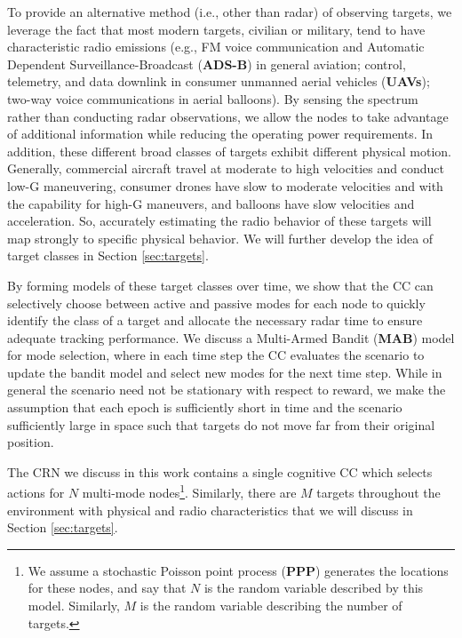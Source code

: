\documentclass[journal,12pt,onecolumn,draftclsnofoot,]{IEEEtran}
\theoremstyle{definition}
\begin{document}
To provide an alternative method (i.e., other than radar) of observing targets, we leverage the fact that most modern targets, civilian or military, tend to have characteristic radio emissions (e.g., FM voice communication and Automatic Dependent Surveillance-Broadcast (\textbf{ADS-B}) in general aviation; control, telemetry, and data downlink in consumer unmanned aerial vehicles (\textbf{UAVs}); two-way voice communications in aerial balloons). 
By sensing the spectrum rather than conducting radar observations, we allow the nodes to take advantage of additional information while reducing the operating power requirements. 
In addition, these different broad classes of targets exhibit different physical motion. Generally, commercial aircraft travel at moderate to high velocities and conduct low-G maneuvering, consumer drones have slow to moderate velocities and with the capability for high-G maneuvers, and balloons have slow velocities and acceleration. 
So, accurately estimating the radio behavior of these targets will map strongly to specific physical behavior. 
We will further develop the idea of target classes in Section \ref{sec:targets}. 

By forming models of these target classes over time, we show that the CC can selectively choose between active and passive modes for each node to quickly identify the class of a target and allocate the necessary radar time to ensure adequate tracking performance. 
We discuss a Multi-Armed Bandit (\textbf{MAB}) model for mode selection, where in each time step the CC evaluates the scenario to update the bandit model and select new modes for the next time step. 
While in general the scenario need not be stationary with respect to reward, we make the assumption that each epoch is sufficiently short in time and the scenario sufficiently large in space such that targets do not move far from their original position.  

The CRN we discuss in this work contains a single cognitive CC which selects actions for $N$ multi-mode nodes\footnote{We assume a stochastic Poisson point process (\textbf{PPP}) generates the locations for these nodes, and say that $N$ is the random variable described by this model. Similarly, $M$ is the random variable describing the number of targets. }. 
Similarly, there are $M$ targets throughout the environment with physical and radio characteristics that we will discuss in Section \ref{sec:targets}. 
\end{document}
